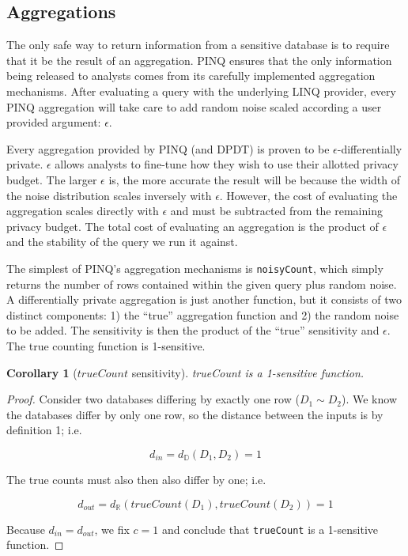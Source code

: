 \documentclass[12pt]{report}
\newtheorem{cor}[defn]{Corollary}
\begin{document}
\subsection{Aggregations}

The only safe way to return information from a sensitive database is to require that it be the result of an aggregation.
PINQ ensures that the only information being released to analysts comes from its carefully implemented aggregation mechanisms.
After evaluating a query with the underlying LINQ provider, every PINQ aggregation will take care to add random noise scaled according a user provided argument: $\epsilon$.

Every aggregation provided by PINQ (and DPDT) is proven to be $\epsilon$-differentially private.
$\epsilon$ allows analysts to fine-tune how they wish to use their allotted privacy budget.
The larger $\epsilon$ is, the more accurate the result will be because the width of the noise distribution scales inversely with $\epsilon$.
However, the cost of evaluating the aggregation scales directly with $\epsilon$ and must be subtracted from the remaining privacy budget.
The total cost of evaluating an aggregation is the product of $\epsilon$ and the stability of the query we run it against.

The simplest of PINQ's aggregation mechanisms is \texttt{noisyCount}, which simply returns the number of rows contained within the given query plus random noise.
A differentially private aggregation is just another function, but it consists of two distinct components: 1) the ``true'' aggregation function and 2) the random noise to be added.
The sensitivity is then the product of the ``true'' sensitivity and $\epsilon$.
The true counting function is 1-sensitive.

\begin{cor}[$trueCount$ sensitivity]
trueCount is a 1-sensitive function.
\end{cor}
\begin{proof}
Consider two databases differing by exactly one row ($D_1 \sim D_2$).
We know the databases differ by only one row, so the distance between the inputs is by definition 1; i.e.

$$d_{in} = d_{\mathbb D}(D_1,D_2)=1$$

The true counts must also then also differ by one; i.e.

$$d_{out} = d_{\mathbb R}(trueCount(D_1),trueCount(D_2))=1$$

Because $d_{in} = d_{out}$, we fix $c=1$ and conclude that \texttt{trueCount} is a 1-sensitive function.
\end{proof}
\end{document}
